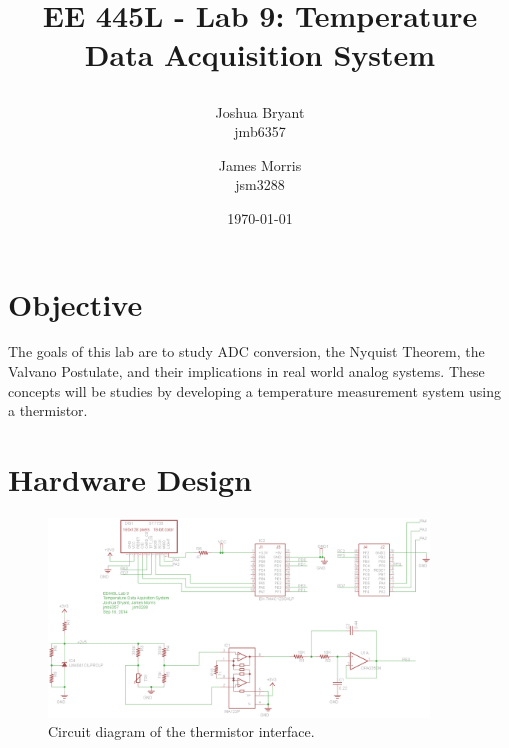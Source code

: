 \documentclass{article}
\title{\begin{LARGE}
	\textbf{EE 445L - Lab 9: Temperature Data Acquisition System}
\end{LARGE}} %
\author{Joshua Bryant \\ jmb6357 \and James Morris \\ jsm3288} %
\date{\today} %
\begin{document}
\maketitle %

\section{Objective}
	The goals of this lab are to study ADC conversion, the Nyquist Theorem, the Valvano Postulate, and their implications in real world analog systems. These concepts will be studies by developing a temperature measurement system using a thermistor.
\section{Hardware Design}
	\begin{figure}[h]
		\includegraphics[keepaspectratio, width = 0.9\textwidth]{Lab9Graphics/circuit.png}
		\caption{Circuit diagram of the thermistor interface.}
	\end{figure}
\end{document}
